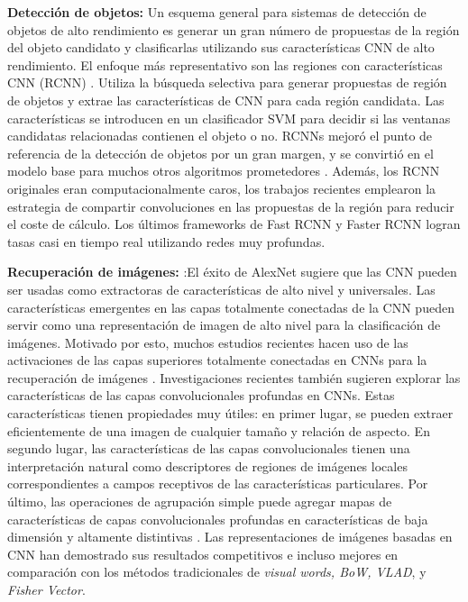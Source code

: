 \textbf{Detección de objetos: }Un esquema general para sistemas de detección de objetos de alto rendimiento es generar un gran número de propuestas de la región del objeto candidato y clasificarlas utilizando sus características CNN de alto rendimiento. El enfoque más representativo son las regiones con características CNN (RCNN) \cite{Girshick}. Utiliza la búsqueda selectiva \cite{Uijlings} para generar propuestas de región de objetos y extrae las características de CNN para cada región candidata. Las características se introducen en un clasificador SVM para decidir si las ventanas candidatas relacionadas contienen el objeto o no. RCNNs mejoró el punto de referencia de la detección de objetos por un gran margen, y se convirtió en el modelo base para muchos otros algoritmos prometedores \cite{Hariharan,Zhu,Zhang}. Además, los RCNN originales eran computacionalmente caros, los trabajos recientes \cite{He,GirshickR} emplearon la estrategia de compartir convoluciones en las propuestas de la región para reducir el coste de cálculo. Los últimos frameworks de Fast RCNN \cite{GirshickR} y Faster RCNN \cite{Ren} logran tasas casi en tiempo real utilizando redes muy profundas.

\textbf{Recuperación de imágenes:} :El éxito de AlexNet \cite{Krizhevsky} sugiere que las CNN pueden ser usadas como extractoras de características de alto nivel y universales. Las características emergentes en las capas totalmente conectadas de la CNN pueden servir como una representación de imagen de alto nivel para la clasificación de imágenes. Motivado por esto, muchos estudios recientes hacen uso de las activaciones de las capas superiores totalmente conectadas en CNNs para la recuperación de imágenes \cite{Gong,Liu,Sharif,Wan,Sun,Babenko}. Investigaciones recientes también sugieren explorar las características de las capas convolucionales profundas en CNNs. Estas características tienen propiedades muy útiles: en primer lugar, se pueden extraer eficientemente de una imagen de cualquier tamaño y relación de aspecto. En segundo lugar, las características de las capas convolucionales tienen una interpretación natural como descriptores de regiones de imágenes locales correspondientes a campos receptivos de las características particulares. Por último, las operaciones de agrupación simple puede agregar mapas de características de capas convolucionales profundas en características de baja dimensión y altamente distintivas \cite{Gong,Sharif,Babenko,RazavianAS,BabenkoA}. Las representaciones de imágenes basadas en CNN han demostrado sus resultados competitivos e incluso mejores en comparación con los métodos tradicionales de  \textit{visual words,  BoW, VLAD}, y \textit{Fisher Vector}.

